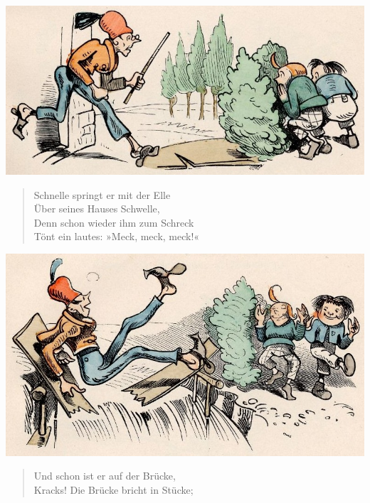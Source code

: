 \documentclass[a4paper,12pt]{article}
\begin{document}
\begin{center}\includegraphics[scale=.7, alt={Böck kommt}]{images/3-05.jpg}\end{center}



\begin{verse}
Schnelle springt er mit der Elle\\{}
Über seines Hauses Schwelle,\\{}
Denn schon wieder ihm zum Schreck\\{}
Tönt ein lautes: »Meck, meck, meck!«
\end{verse}



\begin{center}\includegraphics[scale=.7, alt={... die Brücke bricht}]{images/3-06.jpg}\end{center}



\begin{verse}
Und schon ist er auf der Brücke,\\{}
Kracks! Die Brücke bricht in Stücke;
\end{verse}
\end{document}
